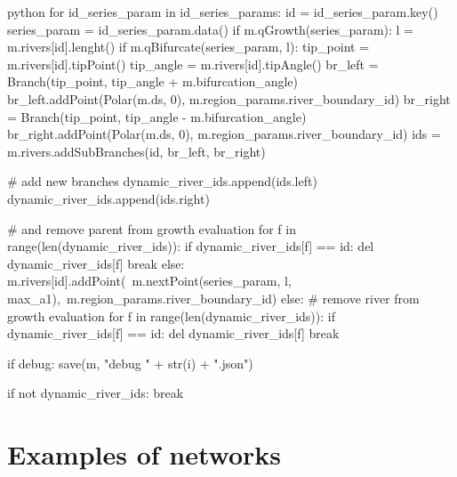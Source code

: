 \documentclass[]{pracamgr}
\begin{document}
\begin{mintedbox}{python}
          for id_series_param in id_series_params:
              id = id_series_param.key()
              series_param = id_series_param.data()
              if m.qGrowth(series_param):
                  l = m.rivers[id].lenght()
                  if m.qBifurcate(series_param, l):
                      tip_point = m.rivers[id].tipPoint()
                      tip_angle = m.rivers[id].tipAngle()
                      br_left = Branch(tip_point, tip_angle + m.bifurcation_angle)
                      br_left.addPoint(Polar(m.ds, 0), m.region_params.river_boundary_id)
                      br_right = Branch(tip_point, tip_angle - m.bifurcation_angle)
                      br_right.addPoint(Polar(m.ds, 0), m.region_params.river_boundary_id)
                      ids = m.rivers.addSubBranches(id, br_left, br_right)

                      # add new branches
                      dynamic_river_ids.append(ids.left)
                      dynamic_river_ids.append(ids.right)

                      # and remove parent from growth evaluation
                      for f in range(len(dynamic_river_ids)):
                          if dynamic_river_ids[f] == id:
                              del dynamic_river_ids[f]
                              break
                  else: 
                      m.rivers[id].addPoint(\
                          m.nextPoint(series_param, l, max_a1),\
                          m.region_params.river_boundary_id)
              else:
                  # remove river from growth evaluation
                  for f in range(len(dynamic_river_ids)):
                      if dynamic_river_ids[f] == id:
                          del dynamic_river_ids[f]
                          break

          if debug:
              save(m, "debug " + str(i) + ".json")

          if not dynamic_river_ids:
              break
      \end{mintedbox}

      \section{Examples of networks}
        
\end{document}
